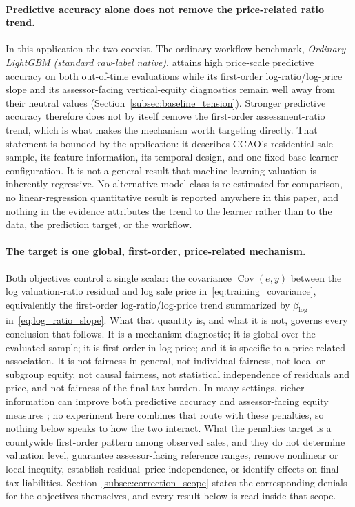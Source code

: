 \documentclass[10pt]{article}
\theoremstyle{definition}
\newcommand{\Cov}{\operatorname{Cov}}
\newcommand{\1}{\mathbf{1}}
\begin{document}
\paragraph{Predictive accuracy alone does not remove the price-related ratio trend.}
In this application the two coexist. The ordinary workflow benchmark, \emph{Ordinary
LightGBM (standard raw-label native)}, attains high price-scale predictive accuracy on both
out-of-time evaluations while its first-order log-ratio/log-price slope and its assessor-facing
vertical-equity diagnostics remain well away from their neutral values
(Section~\ref{subsec:baseline_tension}). Stronger predictive accuracy therefore does not by itself
remove the first-order assessment-ratio trend, which is what makes the mechanism worth targeting
directly. That statement is bounded by the application: it describes CCAO's residential sale
sample, its feature information, its temporal design, and one fixed base-learner configuration. It
is not a general result that machine-learning valuation is inherently regressive. No alternative
model class is re-estimated for comparison, no linear-regression quantitative result is reported
anywhere in this paper, and nothing in the evidence attributes the trend to the learner rather than
to the data, the prediction target, or the workflow.

\paragraph{The target is one global, first-order, price-related mechanism.}
Both objectives control a single scalar: the covariance $\Cov(e,y)$ between the log
valuation-ratio residual and log sale price in~\eqref{eq:training_covariance}, equivalently the
first-order log-ratio/log-price trend summarized by $\beta_{\log}$ in~\eqref{eq:log_ratio_slope}.
What that quantity is, and what it is not, governs every conclusion that follows. It is a mechanism
diagnostic; it is global over the evaluated sample; it is first order in log price; and it is
specific to a price-related association. It is not fairness in general, not individual fairness, not
local or subgroup equity, not causal fairness, not statistical independence of residuals and price,
and not fairness of the final tax burden. In many settings, richer information can improve both
predictive accuracy and assessor-facing equity measures \cite{SmithEtAl2026}; no experiment here
combines that route with these penalties, so nothing below speaks to how the two interact. What the
penalties target is a countywide first-order pattern among observed sales, and they do not determine
valuation level, guarantee assessor-facing reference ranges, remove nonlinear or local inequity,
establish residual--price independence, or identify effects on final tax liabilities.
Section~\ref{subsec:correction_scope} states the corresponding
denials for the objectives themselves, and every result below is read inside that scope.
\end{document}
